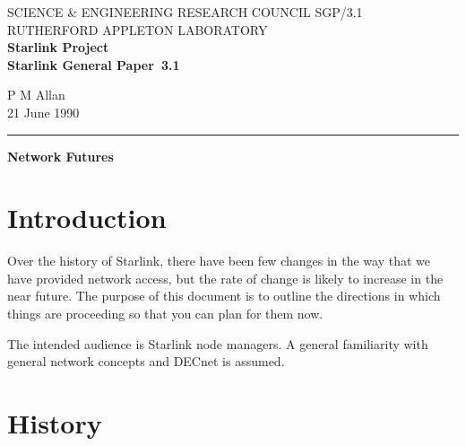 \pagestyle{myheadings}

\newcommand{\stardoccategory}  {Starlink General Paper}
\newcommand{\stardocinitials}  {SGP}
\newcommand{\stardocnumber}    {3.1}
\newcommand{\stardocauthors}   {P M Allan}
\newcommand{\stardocdate}      {21 June 1990}
\newcommand{\stardoctitle}     {Network Futures}

\newcommand{\stardocname}{\stardocinitials /\stardocnumber}
\markright{\stardocname}
\setlength{\textwidth}{160mm}
\setlength{\textheight}{240mm}
\setlength{\topmargin}{-5mm}
\setlength{\oddsidemargin}{0mm}
\setlength{\evensidemargin}{0mm}
\setlength{\parindent}{0mm}
\setlength{\parskip}{\medskipamount}
\setlength{\unitlength}{1mm}


\thispagestyle{empty}
SCIENCE \& ENGINEERING RESEARCH COUNCIL \hfill \stardocname\\
RUTHERFORD APPLETON LABORATORY\\
{\large\bf Starlink Project\\}
{\large\bf \stardoccategory\ \stardocnumber}
\begin{flushright}
\stardocauthors\\
\stardocdate
\end{flushright}
\vspace{-4mm}
\rule{\textwidth}{0.5mm}
\vspace{5mm}
\begin{center}
{\Large\bf \stardoctitle}
\end{center}
\vspace{5mm}

\section{Introduction}

Over the history of Starlink, there have been few changes in the way that we
have provided network access, but the rate of change is likely to increase in
the near future. The purpose of this document is to outline the directions in
which things are proceeding so that you can plan for them now.

The intended audience is Starlink node managers. A general familiarity with
general network concepts and DECnet is assumed.

\section{History}

